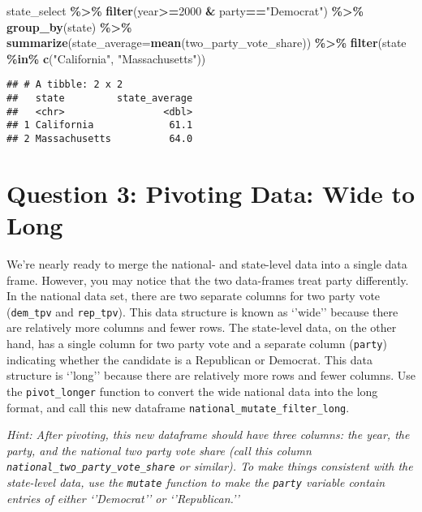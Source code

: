 \documentclass[
]{article}
\newenvironment{Shaded}{\begin{snugshade}}{\end{snugshade}}
\newcommand{\AttributeTok}[1]{\textcolor[rgb]{0.13,0.29,0.53}{#1}}
\newcommand{\DecValTok}[1]{\textcolor[rgb]{0.00,0.00,0.81}{#1}}
\newcommand{\FunctionTok}[1]{\textcolor[rgb]{0.13,0.29,0.53}{\textbf{#1}}}
\newcommand{\NormalTok}[1]{#1}
\newcommand{\SpecialCharTok}[1]{\textcolor[rgb]{0.81,0.36,0.00}{\textbf{#1}}}
\newcommand{\StringTok}[1]{\textcolor[rgb]{0.31,0.60,0.02}{#1}}
\begin{document}
\begin{Shaded}
\begin{Highlighting}[]
\NormalTok{state\_select }\SpecialCharTok{\%\textgreater{}\%}
  \FunctionTok{filter}\NormalTok{(year}\SpecialCharTok{\textgreater{}=}\DecValTok{2000} \SpecialCharTok{\&}\NormalTok{ party}\SpecialCharTok{==}\StringTok{"Democrat"}\NormalTok{) }\SpecialCharTok{\%\textgreater{}\%}
  \FunctionTok{group\_by}\NormalTok{(state) }\SpecialCharTok{\%\textgreater{}\%}
  \FunctionTok{summarize}\NormalTok{(}\AttributeTok{state\_average=}\FunctionTok{mean}\NormalTok{(two\_party\_vote\_share)) }\SpecialCharTok{\%\textgreater{}\%}
  \FunctionTok{filter}\NormalTok{(state }\SpecialCharTok{\%in\%} \FunctionTok{c}\NormalTok{(}\StringTok{"California"}\NormalTok{, }\StringTok{"Massachusetts"}\NormalTok{))}
\end{Highlighting}
\end{Shaded}

\begin{verbatim}
## # A tibble: 2 x 2
##   state         state_average
##   <chr>                 <dbl>
## 1 California             61.1
## 2 Massachusetts          64.0
\end{verbatim}

\section{Question 3: Pivoting Data: Wide to
Long}\label{question-3-pivoting-data-wide-to-long}

We're nearly ready to merge the national- and state-level data into a
single data frame. However, you may notice that the two data-frames
treat party differently. In the national data set, there are two
separate columns for two party vote (\texttt{dem\_tpv} and
\texttt{rep\_tpv}). This data structure is known as `'wide'' because
there are relatively more columns and fewer rows. The state-level data,
on the other hand, has a single column for two party vote and a separate
column (\texttt{party}) indicating whether the candidate is a Republican
or Democrat. This data structure is `'long'' because there are
relatively more rows and fewer columns. Use the \texttt{pivot\_longer}
function to convert the wide national data into the long format, and
call this new dataframe \texttt{national\_mutate\_filter\_long}.

\emph{Hint: After pivoting, this new dataframe should have three
columns: the year, the party, and the national two party vote share
(call this column \texttt{national\_two\_party\_vote\_share} or
similar). To make things consistent with the state-level data, use the
\texttt{mutate} function to make the \texttt{party} variable contain
entries of either `'Democrat'' or `'Republican.''}
\end{document}
